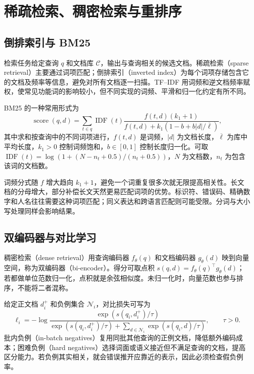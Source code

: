 \setcounter{chapter}{13} %
\chapter{稀疏检索、稠密检索与重排序}
\label{ch:retrieval}

\section{倒排索引与 BM25}

检索任务给定查询 $q$ 和文档库 $\mathcal C$，输出与查询相关的候选文档。稀疏检索（sparse retrieval）主要通过词项匹配；倒排索引（inverted index）为每个词项存储包含它的文档及频率等信息，避免对所有文档逐一扫描。TF--IDF 用词频和逆文档频率赋权，使常见功能词的影响较小，但不同实现的词频、平滑和归一化约定有所不同。

BM25 的一种常用形式为
\begin{equation}
\operatorname{score}(q,d)=\sum_{t\in q}\operatorname{IDF}(t)
\frac{f(t,d)(k_1+1)}{f(t,d)+k_1(1-b+b|d|/\overline\ell)},
\label{eq:bm25}
\end{equation}
其中求和按查询中的不同词项进行，$f(t,d)$ 是词频，$|d|$ 为文档长度，$\overline\ell$ 为库中平均长度，$k_1>0$ 控制词频饱和，$b\in[0,1]$ 控制长度归一化。可取 $\operatorname{IDF}(t)=\log(1+(N-n_t+0.5)/(n_t+0.5))$，$N$ 为文档数，$n_t$ 为包含该词的文档数\cite{bm25}。

词频分式随 $f$ 增大趋向 $k_1+1$，避免一个词重复很多次就无限提高相关性。长文档的分母增大，部分补偿长文天然更易匹配词项的优势。标识符、错误码、精确数字和人名往往需要这种词项匹配；同义表达和跨语言匹配则可能受限。分词与大小写处理同样会影响结果。

\section{双编码器与对比学习}

稠密检索（dense retrieval）用查询编码器 $f_\theta(q)$ 和文档编码器 $g_\theta(d)$ 映到向量空间，称为双编码器（bi-encoder）。得分可取点积 $s(q,d)=f_\theta(q)^\top g_\theta(d)$；若都做单位范数归一化，点积就是余弦相似度。未归一化时，向量范数也参与排序，不能将二者混称\cite{dpr}。

给定正文档 $d_i^+$ 和负例集合 $\mathcal N_i$，对比损失可写为
\begin{equation}
\ell_i=-\log\frac{\exp(s(q_i,d_i^+)/\tau)}{
\exp(s(q_i,d_i^+)/\tau)+\sum_{d\in\mathcal N_i}\exp(s(q_i,d)/\tau)},\qquad \tau>0.
\label{eq:contrastive}
\end{equation}
批内负例（in-batch negatives）复用同批其他查询的正例文档，降低额外编码成本；困难负例（hard negatives）选择词面或语义接近但不满足查询的文档，提高区分能力。若负例其实相关，就会错误推开应靠近的表示，因此必须检查假负例率。

